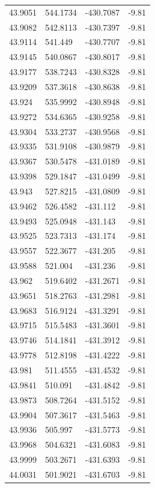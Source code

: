 \begin{table}[H]
\begin{tabular}{llll}
43.9051 & 544.1734 & -430.7087 & -9.81 \\
43.9082 & 542.8113 & -430.7397 & -9.81 \\
43.9114 & 541.449 & -430.7707 & -9.81 \\
43.9145 & 540.0867 & -430.8017 & -9.81 \\
43.9177 & 538.7243 & -430.8328 & -9.81 \\
43.9209 & 537.3618 & -430.8638 & -9.81 \\
43.924 & 535.9992 & -430.8948 & -9.81 \\
43.9272 & 534.6365 & -430.9258 & -9.81 \\
43.9304 & 533.2737 & -430.9568 & -9.81 \\
43.9335 & 531.9108 & -430.9879 & -9.81 \\
43.9367 & 530.5478 & -431.0189 & -9.81 \\
43.9398 & 529.1847 & -431.0499 & -9.81 \\
43.943 & 527.8215 & -431.0809 & -9.81 \\
43.9462 & 526.4582 & -431.112 & -9.81 \\
43.9493 & 525.0948 & -431.143 & -9.81 \\
43.9525 & 523.7313 & -431.174 & -9.81 \\
43.9557 & 522.3677 & -431.205 & -9.81 \\
43.9588 & 521.004 & -431.236 & -9.81 \\
43.962 & 519.6402 & -431.2671 & -9.81 \\
43.9651 & 518.2763 & -431.2981 & -9.81 \\
43.9683 & 516.9124 & -431.3291 & -9.81 \\
43.9715 & 515.5483 & -431.3601 & -9.81 \\
43.9746 & 514.1841 & -431.3912 & -9.81 \\
43.9778 & 512.8198 & -431.4222 & -9.81 \\
43.981 & 511.4555 & -431.4532 & -9.81 \\
43.9841 & 510.091 & -431.4842 & -9.81 \\
43.9873 & 508.7264 & -431.5152 & -9.81 \\
43.9904 & 507.3617 & -431.5463 & -9.81 \\
43.9936 & 505.997 & -431.5773 & -9.81 \\
43.9968 & 504.6321 & -431.6083 & -9.81 \\
43.9999 & 503.2671 & -431.6393 & -9.81 \\
44.0031 & 501.9021 & -431.6703 & -9.81 \\

\end{tabular}
\end{table}

